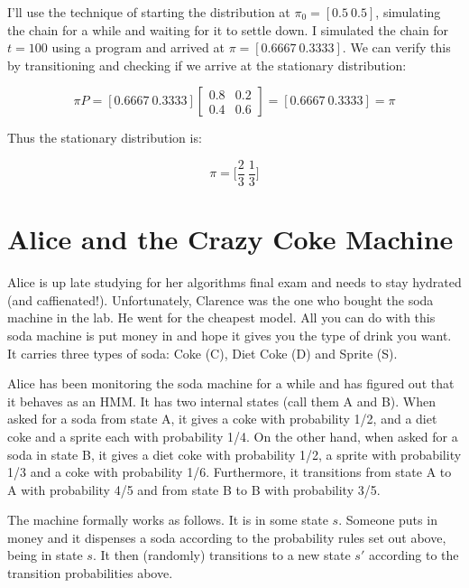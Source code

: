 \documentclass[fleqn]{hermans-hw}
\begin{document}
\begin{enumerate}
I'll use the technique of starting the distribution at $\pi_0 = [0.5 \ 0.5]$, simulating the chain for a while and waiting for it to settle down. I simulated the chain for $t = 100$ using a program and arrived at $\pi = [0.6667 \ 0.3333]$. We can verify this by transitioning and checking if we arrive at the stationary distribution:

$$\pi P = [0.6667 \ 0.3333] \begin{bmatrix}
 0.8 & 0.2 \\
 0.4 & 0.6
\end{bmatrix} = [0.6667 \ 0.3333] = \pi$$

Thus the stationary distribution is:

$$\boxed{\pi = \Big[\frac{2}{3} \ \frac{1}{3}\Big]}$$
\end{enumerate}
\vspace{-0.5cm}
\section{Alice and the Crazy Coke Machine}
\vspace{-0.5cm}
Alice is up late studying for her algorithms final exam and needs to
stay hydrated (and caffienated!).  Unfortunately, Clarence was the one
who bought the soda machine in the lab.  He went for the cheapest
model.  All you can do with this soda machine is put money in and hope
it gives you the type of drink you want.  It carries three types of
soda: Coke (C), Diet Coke (D) and Sprite (S).

Alice has been monitoring the soda machine for a while and has figured
out that it behaves as an HMM.  It has two internal states (call them
A and B).  When asked for a soda from state A, it gives a coke with
probability 1/2, and a diet coke and a sprite each with probability
1/4.  On the other hand, when asked for a soda in state B, it gives a
diet coke with probability 1/2, a sprite with probability 1/3 and a
coke with probability 1/6.  Furthermore, it transitions from state A
to A with probability 4/5 and from state B to B with probability 3/5.

The machine formally works as follows.  It is in some state $s$.
Someone puts in money and it dispenses a soda according to the
probability rules set out above, being in state $s$.  It then
(randomly) transitions to a new state $s'$ according to the transition
probabilities above.
\end{document}
